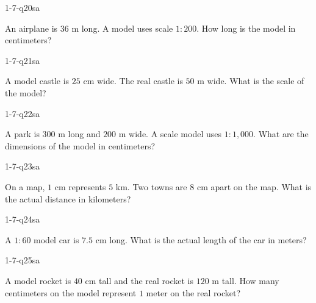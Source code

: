 \begin{practiceQuestion}{1-7-q20}{sa}
\begin{questionText}
An airplane is $36$ m long. A model uses scale $1 : 200$. How long is the model in centimeters?
\end{questionText}
\end{practiceQuestion}

\begin{practiceQuestion}{1-7-q21}{sa}
\begin{questionText}
A model castle is $25$ cm wide. The real castle is $50$ m wide. What is the scale of the model?
\end{questionText}
\end{practiceQuestion}

\begin{practiceQuestion}{1-7-q22}{sa}
\begin{questionText}
A park is $300$ m long and $200$ m wide. A scale model uses $1 : 1{,}000$. What are the dimensions of the model in centimeters?
\end{questionText}
\end{practiceQuestion}

\begin{practiceQuestion}{1-7-q23}{sa}
\begin{questionText}
On a map, $1$ cm represents $5$ km. Two towns are $8$ cm apart on the map. What is the actual distance in kilometers?
\end{questionText}
\end{practiceQuestion}

\begin{practiceQuestion}{1-7-q24}{sa}
\begin{questionText}
A $1 : 60$ model car is $7.5$ cm long. What is the actual length of the car in meters?
\end{questionText}
\end{practiceQuestion}

\begin{practiceQuestion}{1-7-q25}{sa}
\begin{questionText}
A model rocket is $40$ cm tall and the real rocket is $120$ m tall. How many centimeters on the model represent $1$ meter on the real rocket?
\end{questionText}
\end{practiceQuestion}

